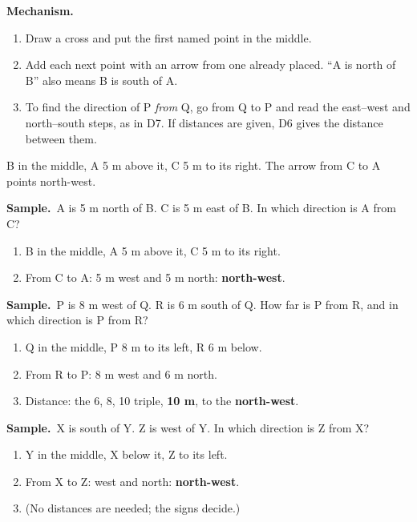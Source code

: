 \documentclass[11pt,a4paper]{article}
\newcommand{\mech}{\textbf{\color{ember}Mechanism.}\ }
\newif\ifkeepsamp
\newcommand{\samp}{\ifkeepsamp\needspace{4\baselineskip}\fi\textbf{\color{ember}Sample.}\ }
\begin{document}
\mech
\begin{enumerate}
\item Draw a cross and put the first named point in the middle.
\item Add each next point with an arrow from one already placed. ``A is north of B'' also means B is south of A.
\item To find the direction of P \emph{from} Q, go from Q to P and read the east--west and north--south steps, as in D7. If distances are given, D6 gives the distance between them.
\end{enumerate}

\begin{center}
\par\nopagebreak\smallskip
{\small B in the middle, A 5 m above it, C 5 m to its right. The arrow from C to A points north-west.}
\end{center}

\samp A is 5 m north of B. C is 5 m east of B. In which direction is A from C?
\begin{enumerate}
\item B in the middle, A 5 m above it, C 5 m to its right.
\item From C to A: 5 m west and 5 m north: \textbf{north-west}.
\end{enumerate}
\samp P is 8 m west of Q. R is 6 m south of Q. How far is P from R, and in which direction is P from R?
\begin{enumerate}
\item Q in the middle, P 8 m to its left, R 6 m below.
\item From R to P: 8 m west and 6 m north.
\item Distance: the 6, 8, 10 triple, \textbf{10 m}, to the \textbf{north-west}.
\end{enumerate}
\samp X is south of Y. Z is west of Y. In which direction is Z from X?
\begin{enumerate}
\item Y in the middle, X below it, Z to its left.
\item From X to Z: west and north: \textbf{north-west}.
\item (No distances are needed; the signs decide.)
\end{enumerate}
\end{document}
